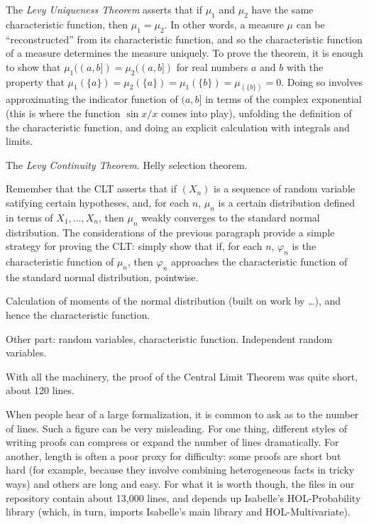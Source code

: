 \documentclass{article}
\newcommand{\ph}{\varphi}
\begin{document}
The \emph{Levy Uniqueness Theorem} asserts that if $\mu_1$ and $\mu_2$ have the same characteristic function, then $\mu_1 = \mu_2$. In other words, a measure $\mu$ can be ``reconstructed'' from its characteristic function, and so the characteristic function of a measure determines the measure uniquely. To prove the theorem, it is enough to show that $\mu_1((a,b]) = \mu_2((a,b])$ for real numbers $a$ and $b$ with the property that $\mu_1(\{a\}) = \mu_2(\{a\}) = \mu_1(\{b\}) = \mu_(\{b\}) = 0$. Doing so involves approximating the indicator function of $(a,b]$ in terms of the complex exponential (this is where the function $\sin x / x$ comes into play), unfolding the definition of the characteristic function, and doing an explicit calculation with integrals and limits.

The \emph{Levy Continuity Theorem}. Helly selection theorem. 



Remember that the CLT asserts that if $(X_n)$ is a sequence of random variable satifying certain hypotheses, and, for each $n$, $\mu_n$ is a certain distribution defined in terms of $X_1, \ldots, X_n$, then $\mu_n$ weakly converges to the standard normal distribution. The considerations of the previous paragraph provide a simple strategy for proving the CLT: simply show that if, for each $n$, $\ph_n$ is the characteristic function of $\mu_n$, then $\ph_n$ approaches the characteristic function of the standard normal distribution, pointwise.

Calculation of moments of the normal distribution (built on work by \ldots), and hence the characteristic function.

Other part: random variables, characteristic function. Independent random variables. 

With all the machinery, the proof of the Central Limit Theorem was quite short, about 120 lines. 

When people hear of a large formalization, it is common to ask as to the number of lines. Such a figure can be very misleading. For one thing, different styles of writing proofs can compress or expand the number of lines dramatically. For another, length is often a poor proxy for difficulty: some proofs are short but hard (for example, because they involve combining heterogeneous facts in tricky ways) and others are long and easy. For what it is worth though, the files in our repository contain about 13,000 lines, and depends up Isabelle's HOL-Probability library (which, in turn, imports Isabelle's main library and HOL-Multivariate).
\end{document}

